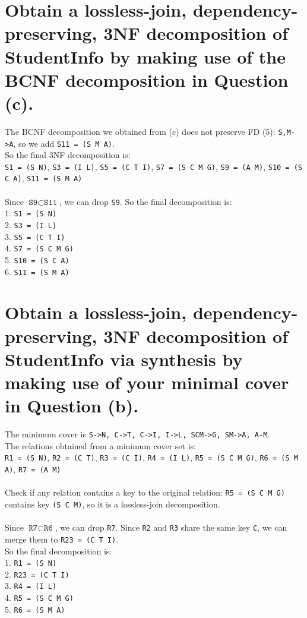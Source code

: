 \documentclass{article}
\begin{document}
\section{Obtain a lossless-join, dependency-preserving, 3NF decomposition of StudentInfo by
making use of the BCNF decomposition in Question (c).}
The BCNF decomposition we obtained from (c) does not preserve FD (5): \texttt{S,M->A}, so we add \texttt{S11 = (S M A)}.\\
So the final 3NF decomposition is: \\
\texttt{S1 = (S N)}, \texttt{S3 = (I L)}, \texttt{S5 = (C T I)}, \texttt{S7 = (S C M G)}, \texttt{S9 = (A M)}, \texttt{S10 = (S C A)}, \texttt{S11 = (S M A)}\\
\\
Since \(\texttt{S9} \subset \texttt{S11}\), we can drop \texttt{S9}.
So the final decomposition is:\\
1. \texttt{S1 = (S N)} \\
2. \texttt{S3 = (I L)} \\
3. \texttt{S5 = (C T I)} \\
4. \texttt{S7 = (S C M G)} \\
5. \texttt{S10 = (S C A)}\\
6. \texttt{S11 = (S M A)}\\


\section{Obtain a lossless-join, dependency-preserving, 3NF decomposition of StudentInfo via
synthesis by making use of your minimal cover in Question (b).}
The minimum cover is \texttt{S->N, C->T, C->I, I->L, SCM->G, SM->A, A-M}.\\
The relations obtained from a minimum cover set is:\\
\texttt{R1 = (S N)}, \texttt{R2 = (C T)}, \texttt{R3 = (C I)}, \texttt{R4 = (I L)}, \texttt{R5 = (S C M G)}, \texttt{R6 = (S M A)}, \texttt{R7 = (A M)}\\
\\
Check if any relation contains a key to the original relation:
\texttt{R5 = (S C M G)} contains key \texttt{(S C M)}, so it is a lossless-join decomposition.\\
\\
Since \( \texttt{R7} \subset \texttt{R6} \), we can drop \texttt{R7}.
Since \texttt{R2} and \texttt{R3} share the same key \texttt{C}, we can merge them to \texttt{R23 = (C T I)}.
\\
So the final decomposition is:\\
1. \texttt{R1 = (S N)}\\
2. \texttt{R23 = (C T I)}\\
3. \texttt{R4 = (I L)}\\
4. \texttt{R5 = (S C M G)}\\
5. \texttt{R6 = (S M A)}\\
\end{document}
